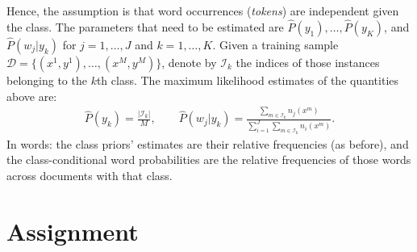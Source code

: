 Hence, the assumption is that word occurrences (\emph{tokens}) are independent given the class. 
The parameters that need to be estimated are ${\hat P}(y_1),\ldots,{\hat P}(y_K)$, and ${\hat P}(w_j|y_k)$ for $j=1,\ldots,J$ and $k=1,\ldots,K$. 
Given a training sample $\mathcal{D} = \{(x^{1},y^{1}),\ldots,(x^{M},y^{M})\}$, 
denote by $\mathcal{I}_k$ the indices of those instances belonging to the $k$th class. 
The maximum likelihood estimates of the quantities above are: 
\begin{eqnarray}\label{eq:mlemultinomial}
{\hat P}(y_k) = \frac{|\mathcal{I}_k|}{M}, \qquad
{\hat P}(w_j|y_k) = \frac{\sum_ {m \in \mathcal{I}_k} n_j(x^m)}{\sum_{i=1}^J \sum_ {m\in \mathcal{I}_k} n_i(x^m)}.
\end{eqnarray}
In words: the class priors' estimates are their relative frequencies (as before), and 
the class-conditional word probabilities are the relative frequencies of those words across documents with that class.


\section{Assignment}

